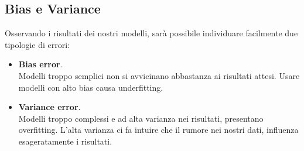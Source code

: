 \subsection{Bias e Variance}

Osservando i risultati dei nostri modelli, sarà possibile individuare facilmente due tipologie di errori:
\begin{itemize}
	\item \textbf{Bias error}.\\
	Modelli troppo semplici non si avvicinano abbastanza ai risultati attesi. Usare modelli con alto bias causa underfitting.
	\item \textbf{Variance error}.\\
	Modelli troppo complessi e ad alta varianza nei risultati, presentano overfitting. L'alta varianza ci fa intuire che il rumore nei nostri dati, influenza esageratamente i risultati.
\end{itemize}



